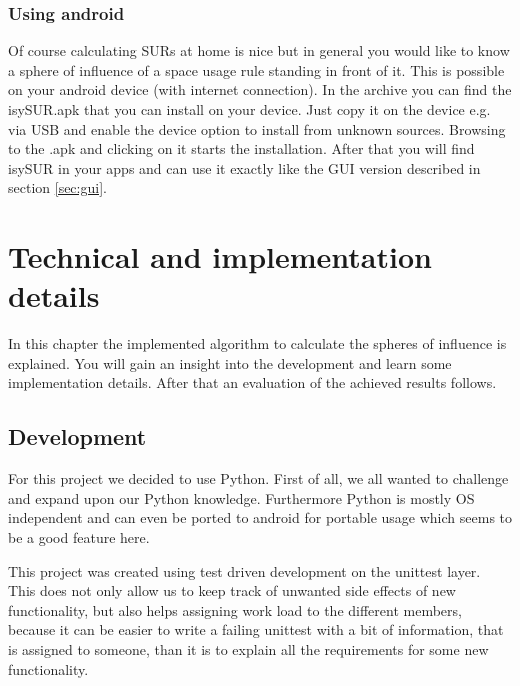 \documentclass[11pt,fleqn]{book} %
\newcommand{\todol}{\todo[inline]} %
\begin{document}
\subsection{Using android}\label{sec:android}
Of course calculating SURs at home is nice but in general you would like to know a sphere of influence of a space usage rule standing in front of it. This is possible on your android device (with internet connection). In the archive you can find the isySUR.apk that you can install on your device. Just copy it on the device e.g. via USB and enable the device option to install from unknown sources. Browsing to the .apk and clicking on it starts the installation. After that you will find isySUR in your apps and can use it exactly like the GUI version described in section \ref{sec:gui}.


\chapter{Technical and implementation details}
In this chapter the implemented algorithm to calculate the spheres of influence is explained. You will gain an insight into the development and learn some implementation details. After that an evaluation of the achieved results follows.

\todol{Code documentation -> pydoc?}

\section{Development}
For this project we decided to use Python. First of all, we all wanted to challenge and expand upon our Python knowledge. Furthermore Python is mostly OS independent and can even be ported to android for portable usage which seems to be a good feature here.

This project was created using test driven development on the unittest layer. This does not only allow us to keep track of unwanted side effects of new functionality, but also helps assigning work load to the different members, because it can be easier to write a failing unittest with a bit of information, that is assigned to someone, than it is to explain all the requirements for some new functionality.
\end{document}
